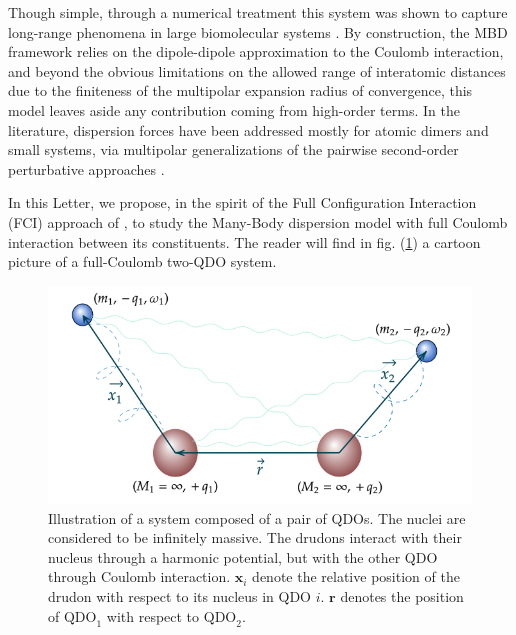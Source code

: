\documentclass[reprint, amsmath, amssymb, aps, pra]{revtex4-2}
\begin{document}
    Though simple, through a numerical treatment this system was shown to capture long-range phenomena in large biomolecular systems \cite{https://doi.org/10.48550/arxiv.2205.11549}. By construction, the MBD framework relies on the dipole-dipole approximation to the Coulomb interaction, and beyond the obvious limitations on the allowed range of interatomic distances due to the finiteness of the multipolar expansion radius of convergence, this model leaves aside any contribution coming from high-order terms. In the literature, dispersion forces have been addressed mostly for atomic dimers and small systems, via multipolar generalizations of the pairwise second-order perturbative approaches \cite{massa2021beyond,massa2021many,becke2006simple,becke2006exchange}.

    In this Letter, we propose, in the spirit of the Full Configuration Interaction (FCI) approach of \cite{sadhukhan2016quantum}, to study the Many-Body dispersion model with full Coulomb interaction between its constituents. The reader will find in fig. (\ref{fig:qdos}) a cartoon picture of a full-Coulomb two-QDO system.

    \begin{figure}
            \includegraphics[scale=0.39]{figures/qdos.png}
            \caption{\label{fig:qdos}Illustration of a system composed of a pair of QDOs. The nuclei are considered to be infinitely massive. The drudons interact with their nucleus through a harmonic potential, but with the other QDO through Coulomb interaction. $\bm x_i$ denote the relative position of the drudon with respect to its nucleus in QDO $i$. $\bm r$ denotes the position of $\text{QDO}_1$ with respect to $\text{QDO}_2$.}
        \end{figure}
\end{document}
